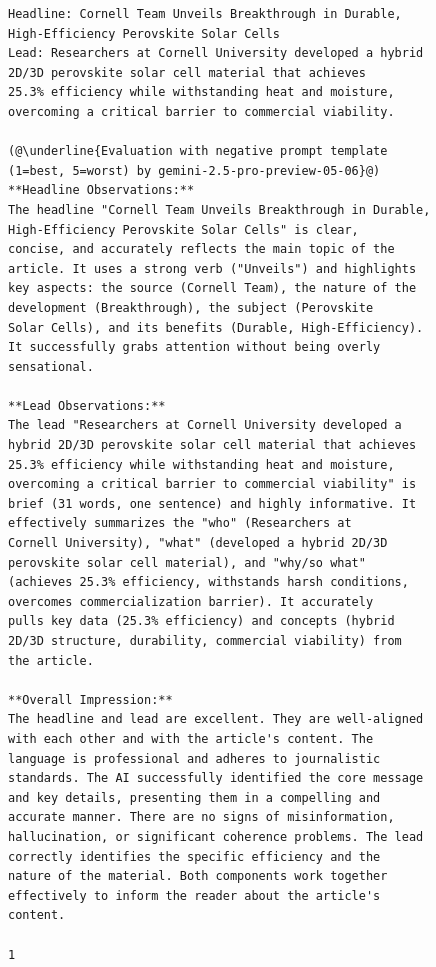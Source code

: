 \documentclass[UTF8,noindent,nohyp,parspace,titlepage,twoside,12pt]{article}
\begin{document}
    \begin{figure}[!hbtp]
      \begin{lstlisting}[basicstyle=\tiny\sffamily,frame=single,linewidth=\textwidth]
Headline: Cornell Team Unveils Breakthrough in Durable, High-Efficiency Perovskite Solar Cells
Lead: Researchers at Cornell University developed a hybrid 2D/3D perovskite solar cell material that achieves
25.3% efficiency while withstanding heat and moisture, overcoming a critical barrier to commercial viability.

(@\underline{Evaluation with negative prompt template (1=best, 5=worst) by gemini-2.5-pro-preview-05-06}@)
**Headline Observations:**
The headline "Cornell Team Unveils Breakthrough in Durable, High-Efficiency Perovskite Solar Cells" is clear,
concise, and accurately reflects the main topic of the article. It uses a strong verb ("Unveils") and highlights
key aspects: the source (Cornell Team), the nature of the development (Breakthrough), the subject (Perovskite
Solar Cells), and its benefits (Durable, High-Efficiency). It successfully grabs attention without being overly
sensational.

**Lead Observations:**
The lead "Researchers at Cornell University developed a hybrid 2D/3D perovskite solar cell material that achieves
25.3% efficiency while withstanding heat and moisture, overcoming a critical barrier to commercial viability" is
brief (31 words, one sentence) and highly informative. It effectively summarizes the "who" (Researchers at
Cornell University), "what" (developed a hybrid 2D/3D perovskite solar cell material), and "why/so what"
(achieves 25.3% efficiency, withstands harsh conditions, overcomes commercialization barrier). It accurately
pulls key data (25.3% efficiency) and concepts (hybrid 2D/3D structure, durability, commercial viability) from
the article.

**Overall Impression:**
The headline and lead are excellent. They are well-aligned with each other and with the article's content. The
language is professional and adheres to journalistic standards. The AI successfully identified the core message
and key details, presenting them in a compelling and accurate manner. There are no signs of misinformation,
hallucination, or significant coherence problems. The lead correctly identifies the specific efficiency and the
nature of the material. Both components work together effectively to inform the reader about the article's
content.

1


\end{lstlisting}
\end{figure}
\end{document}
